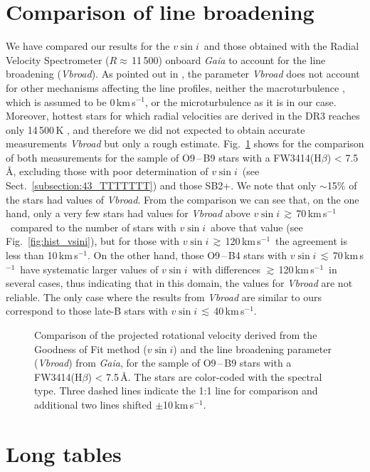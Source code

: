 \documentclass{aa}
\newcommand{\kms}{\mbox{km\,s$^{-1}$}}
\newcommand{\vsini}{\mbox{$v\sin i$}}
\newcommand{\ls}{\mbox{$\lesssim$}}
\newcommand{\gs}{\mbox{$\gtrsim$}}
\begin{document}
\begin{appendix}
\FloatBarrier


\section{Comparison of line broadening}
\label{apen.vsini}

We have compared our results for the \vsini\ and those obtained with the Radial Velocity Spectrometer ($R\approx$\,11\,500) onboard {\em Gaia} to account for the line broadening (\textit{Vbroad}). As pointed out in \citet{2022arXiv220610986F}, the parameter \textit{Vbroad} does not account for other mechanisms affecting the line profiles, neither the macroturbulence \citep[e.g.][]{2009A&A...508..409A,2010ApJ...720L.174S}, which is assumed to be 0\,\kms, or the microturbulence \citep[e.g.][]{2009A&A...499..279C,2015ApJ...808L..31G} as it is in our case. Moreover, hottest stars for which radial velocities are derived in the DR3 reaches only 14\,500\,K \citep{2022arXiv220605486B}, and therefore we did not expected to obtain accurate measurements \textit{Vbroad} but only a rough estimate. Fig.~\ref{fig:vbroad} shows for the comparison of both measurements for the sample of O9\,--\,B9 stars with a FW3414(H$\beta$) < 7.5\,\AA, excluding those with poor determination of \vsini\ (see Sect.~\ref{subsection:43_TTTTTTT}) and those SB2+. We note that only $\sim$15\% of the stars had values of \textit{Vbroad}. From the comparison we can see that, on the one hand, only a very few stars had values for \textit{Vbroad} above \vsini\,\gs\,70\,\kms\ compared to the number of stars with \vsini\ above that value (see Fig.~\ref{fig:hist_vsini}), but for those with \vsini\,\gs\,120\,\kms\ the agreement is less than 10\,\kms. On the other hand, those O9\,--\,B4 stars with \vsini\,\ls\,70\,\kms\ have systematic larger values of \vsini\ with differences \gs\,120\,\kms\ in several cases, thus indicating that in this domain, the values for \textit{Vbroad} are not reliable. The only case where the results from \textit{Vbroad} are similar to ours correspond to those late-B stars with \vsini\,\ls\,40\,\kms. 

\begin{figure}[!t]
\centering
{}
\caption{Comparison of the projected rotational velocity derived from the Goodness of Fit method (\vsini) and the line broadening parameter (\textit{Vbroad}) from {\em Gaia}, for the sample of O9\,--\,B9 stars with a FW3414(H$\beta$) < 7.5\,\AA. The stars are color-coded with the spectral type. Three dashed lines indicate the 1:1 line for comparison and additional two lines shifted $\pm$10\,\kms.} 
\label{fig:vbroad}
\end{figure}


\section{Long tables}




\end{appendix}
\end{document}
